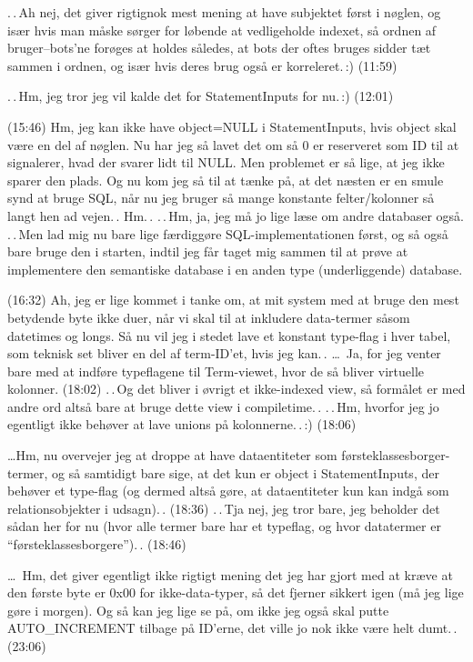 \documentclass{report}
\begin{document}
.\,.\,Ah nej, det giver rigtignok mest mening at have subjektet først i nøglen, og især hvis man måske sørger for løbende at vedligeholde indexet, så ordnen af bruger--bots'ne forøges at holdes således, at bots der oftes bruges sidder tæt sammen i ordnen, og især hvis deres brug også er korreleret.\,:) (11:59)

.\,.\,Hm, jeg tror jeg vil kalde det for StatementInputs for nu.\,:) (12:01)

(15:46) Hm, jeg kan ikke have object=NULL i StatementInputs, hvis object skal være en del af nøglen. Nu har jeg så lavet det om så 0 er reserveret som ID til at signalerer, hvad der svarer lidt til NULL. Men problemet er så lige, at jeg ikke sparer den plads. Og nu kom jeg så til at tænke på, at det næsten er en smule synd at bruge SQL, når nu jeg bruger så mange konstante felter/kolonner så langt hen ad vejen.\,. Hm.\,. .\,.\,Hm, ja, jeg må jo lige læse om andre databaser også. .\,.\,Men lad mig nu bare lige færdiggøre SQL-implementationen først, og så også bare bruge den i starten, indtil jeg får taget mig sammen til at prøve at implementere den semantiske database i en anden type (underliggende) database.

(16:32) Ah, jeg er lige kommet i tanke om, at mit system med at bruge den mest betydende byte ikke duer, når vi skal til at inkludere data-termer såsom datetimes og longs. Så nu vil jeg i stedet lave et konstant type-flag i hver tabel, som teknisk set bliver en del af term-ID'et, hvis jeg kan.\,. \ldots\ Ja, for jeg venter bare med at indføre typeflagene til Term-viewet, hvor de så bliver virtuelle kolonner. (18:02) .\,.\,Og det bliver i øvrigt et ikke-indexed view, så formålet er med andre ord altså bare at bruge dette view i compiletime.\,. .\,.\,Hm, hvorfor jeg jo egentligt ikke behøver at lave unions på kolonnerne.\,.\,:) (18:06)

\ldots Hm, nu overvejer jeg at droppe at have dataentiteter som førsteklassesborger-termer, og så samtidigt bare sige, at det kun er object i StatementInputs, der behøver et type-flag (og dermed altså gøre, at dataentiteter kun kan indgå som relationsobjekter i udsagn).\,. (18:36)  .\,.\,Tja nej, jeg tror bare, jeg beholder det sådan her for nu (hvor alle termer bare har et typeflag, og hvor datatermer er ``førsteklassesborgere'').\,. (18:46)

\ldots\ Hm, det giver egentligt ikke rigtigt mening det jeg har gjort med at kræve at den første byte er 0x00 for ikke-data-typer, så det fjerner sikkert igen (må jeg lige gøre i morgen). Og så kan jeg lige se på, om ikke jeg også skal putte AUTO\_INCREMENT tilbage på ID'erne, det ville jo nok ikke være helt dumt.\,. (23:06)
\end{document}
